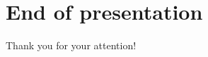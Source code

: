 \documentclass[12pt]{beamer}
\begin{document}
\section{End of presentation}
\begin{frame}
\centering
\Huge Thank you for your attention!
\end{frame}

\end{document}
